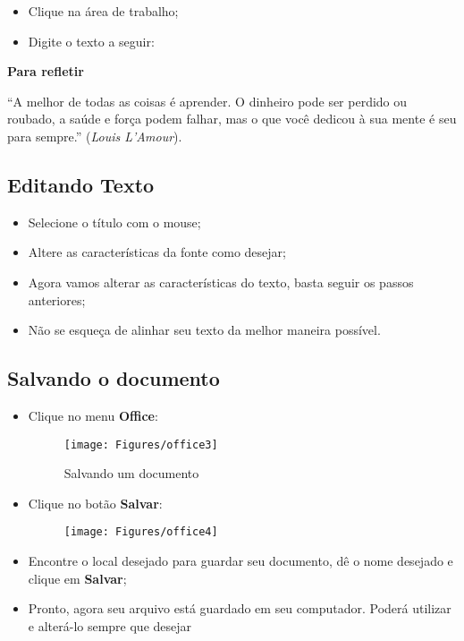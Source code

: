 \documentclass[hidelinks,12pt]{article}
\begin{document}
		\begin{itemize}
			\item Clique na área de trabalho;

			\item Digite o texto a seguir:
		\end{itemize}


		{\textbf{\hspace{5cm} Para refletir}}

		``A melhor de todas as coisas é aprender. O dinheiro pode ser perdido ou roubado, a saúde e força podem falhar, mas o que você dedicou à sua mente é seu para sempre.'' (\emph{Louis L'Amour}).



	\subsection{Editando Texto}

		\begin{itemize}
			\item Selecione o título com o mouse;

			\item Altere as características da fonte como desejar;

			\item Agora vamos alterar as características do texto, basta seguir os passos anteriores;

			\item Não se esqueça de alinhar seu texto da melhor maneira possível.
		\end{itemize}


	\subsection{Salvando o documento}

	\begin{itemize}
		\item Clique no menu \textbf{Office}:

		\begin{figure}[!h]
			\centering
			\texttt{[image: Figures/office3]}
			\label{fig:office3}
			\caption{Salvando um documento}
		\end{figure}

		\item Clique no botão \textbf{Salvar}:

		\begin{figure}[!h]
			\centering
			\texttt{[image: Figures/office4]}
			\label{fig:office4}
		\end{figure}


		\item Encontre o local desejado para guardar seu documento, dê o nome desejado e clique em \textbf{Salvar};

		\item Pronto, agora seu arquivo está guardado em seu computador. Poderá utilizar e alterá-lo sempre que desejar

	\end{itemize}
\end{document}
